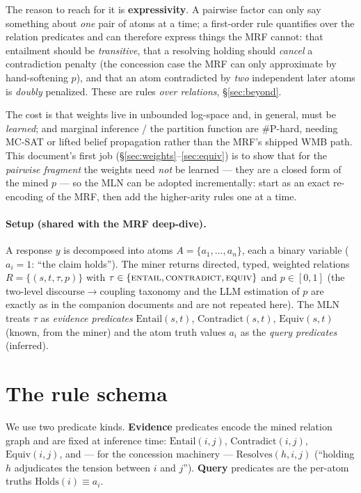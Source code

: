 \documentclass[11pt]{article}
\newcommand{\Ent}{\textsc{entail}}
\newcommand{\Con}{\textsc{contradict}}
\newcommand{\Equ}{\textsc{equiv}}
\begin{document}
The reason to reach for it is \textbf{expressivity}. A pairwise factor can only say something
about \emph{one} pair of atoms at a time; a first-order rule quantifies over the relation
predicates and can therefore express things the MRF cannot: that entailment should be
\emph{transitive}, that a resolving holding should \emph{cancel} a contradiction penalty
(the concession case the MRF can only approximate by hand-softening $p$), and that an atom
contradicted by \emph{two} independent later atoms is \emph{doubly} penalized. These are
rules \emph{over relations}, \S\ref{sec:beyond}.

The cost is that weights live in unbounded log-space and, in general, must be
\emph{learned}; and marginal inference / the partition function are \#P-hard, needing
MC-SAT or lifted belief propagation rather than the MRF's shipped WMB path. This document's
first job (\S\ref{sec:weights}--\ref{sec:equiv}) is to show that for the \emph{pairwise
fragment} the weights need \emph{not} be learned --- they are a closed form of the mined
$p$ --- so the MLN can be adopted incrementally: start as an exact re-encoding of the MRF,
then add the higher-arity rules one at a time.

\paragraph{Setup (shared with the MRF deep-dive).} A response $y$ is decomposed into atoms
$A=\{a_1,\dots,a_n\}$, each a binary variable ($a_i{=}1$: ``the claim holds''). The miner
returns directed, typed, weighted relations $R=\{(s,t,\tau,p)\}$ with
$\tau\in\{\Ent,\Con,\Equ\}$ and $p\in[0,1]$ (the two-level discourse$\to$coupling taxonomy
and the LLM estimation of $p$ are exactly as in the companion documents and are not
repeated here). The MLN treats $\tau$ as \emph{evidence predicates}
$\mathrm{Entail}(s,t)$, $\mathrm{Contradict}(s,t)$, $\mathrm{Equiv}(s,t)$ (known, from the
miner) and the atom truth values $a_i$ as the \emph{query predicates} (inferred).

\section{The rule schema}
\label{sec:schema}

We use two predicate kinds. \textbf{Evidence} predicates encode the mined relation graph and
are fixed at inference time: $\mathrm{Entail}(i,j)$, $\mathrm{Contradict}(i,j)$,
$\mathrm{Equiv}(i,j)$, and --- for the concession machinery --- $\mathrm{Resolves}(h,i,j)$
(``holding $h$ adjudicates the tension between $i$ and $j$''). \textbf{Query} predicates are
the per-atom truths $\mathrm{Holds}(i)\equiv a_i$.
\end{document}
